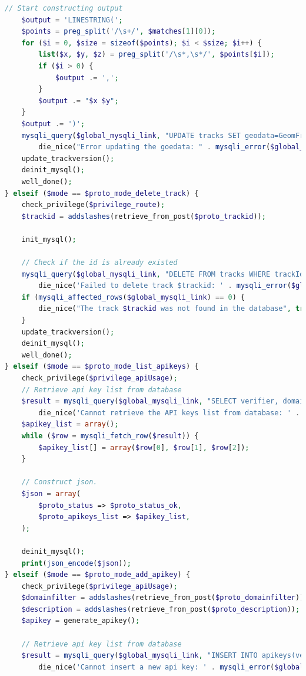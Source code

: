 \documentclass[a4paper,twoside]{article}
\begin{document}
\begin{enumerate}
\begin{lstlisting}[language=PHP,basicstyle=\tiny,caption=handle.php,label={lst:handle.php}]
	// Start constructing output
	$output = 'LINESTRING(';
	$points = preg_split('/\s+/', $matches[1][0]);
	for ($i = 0, $size = sizeof($points); $i < $size; $i++) {
		list($x, $y, $z) = preg_split('/\s*,\s*/', $points[$i]);
		if ($i > 0) {
			$output .= ',';
		}
		$output .= "$x $y";
	}
	$output .= ')';
	mysqli_query($global_mysqli_link, "UPDATE tracks SET geodata=GeomFromText('$output'), transferNodes=NULL WHERE trackId='$trackid'") or
		die_nice("Error updating the goedata: " . mysqli_error($global_mysqli_link), true);
	update_trackversion();
	deinit_mysql();
	well_done();
} elseif ($mode == $proto_mode_delete_track) {
	check_privilege($privilege_route);
	$trackid = addslashes(retrieve_from_post($proto_trackid));
	
	init_mysql();
	
	// Check if the id is already existed
	mysqli_query($global_mysqli_link, "DELETE FROM tracks WHERE trackId='$trackid'") or
		die_nice('Failed to delete track $trackid: ' . mysqli_error($global_mysqli_link), true);
	if (mysqli_affected_rows($global_mysqli_link) == 0) {
		die_nice("The track $trackid was not found in the database", true);
	}
	update_trackversion();
	deinit_mysql();
	well_done();	
} elseif ($mode == $proto_mode_list_apikeys) {
	check_privilege($privilege_apiUsage);
	// Retrieve api key list from database
	$result = mysqli_query($global_mysqli_link, "SELECT verifier, domainFilter, description FROM apikeys WHERE email='$active_userid' ORDER BY verifier") or
		die_nice('Cannot retrieve the API keys list from database: ' . mysqli_error($global_mysqli_link));
	$apikey_list = array();	
	while ($row = mysqli_fetch_row($result)) {
		$apikey_list[] = array($row[0], $row[1], $row[2]);
	}
	
	// Construct json.
	$json = array(
		$proto_status => $proto_status_ok,
		$proto_apikeys_list => $apikey_list,
	);
	
	deinit_mysql();
	print(json_encode($json));
} elseif ($mode == $proto_mode_add_apikey) {
	check_privilege($privilege_apiUsage);
	$domainfilter = addslashes(retrieve_from_post($proto_domainfilter));
	$description = addslashes(retrieve_from_post($proto_description));
	$apikey = generate_apikey();
	
	// Retrieve api key list from database
	$result = mysqli_query($global_mysqli_link, "INSERT INTO apikeys(verifier, email, domainFilter, description) VALUES('$apikey', '$active_userid', '$domainfilter', '$description')") or
		die_nice('Cannot insert a new api key: ' . mysqli_error($global_mysqli_link));


\end{lstlisting}
\end{enumerate}
\end{document}
